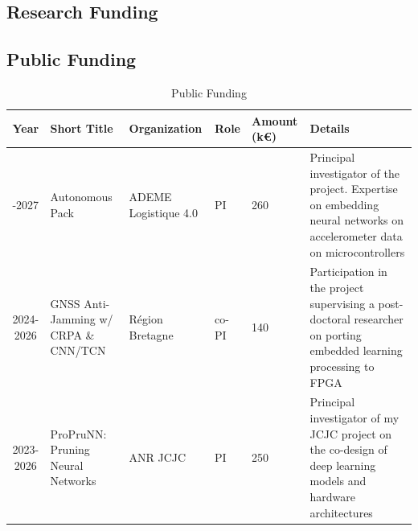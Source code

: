 \documentclass[11pt]{report}
\begin{document}
\begin{landscape}
  \section{Research Funding}
  \label{sec:financement}

  \subsection{Public Funding}
  {\small
    \begin{longtable}{|c|l|p{3cm}|p{}|p{1.5cm}|p{6.5cm}|}
      \caption{Public Funding} \label{tab:financements_publics}                                                                                                                                                                                      \\
      \hline
      \textbf{Year} & \textbf{Short Title}                  & \textbf{Organization} & \textbf{Role} & \textbf{Amount (k€)} & \textbf{Details}                                                                                                        \\
      \hline
      \endfirsthead
      \endfoot
      \hline
      \endlastfoot
      2023-2027     & Autonomous Pack                       & ADEME Logistique 4.0  & PI            & 260                  & Principal investigator of the project. Expertise on embedding neural networks on accelerometer data on microcontrollers \\
      2024-2026     & GNSS Anti-Jamming w/ CRPA \& CNN/TCN  & R\'egion Bretagne     & co-PI         & 140                  & Participation in the project supervising a post-doctoral researcher on porting embedded learning processing to FPGA     \\
      2023-2026     & ProPruNN: Pruning Neural Networks     & ANR JCJC              & PI            & 250                  & Principal investigator of my JCJC project on the co-design of deep learning models and hardware architectures           \\

\end{longtable}}
\end{landscape}
\end{document}
